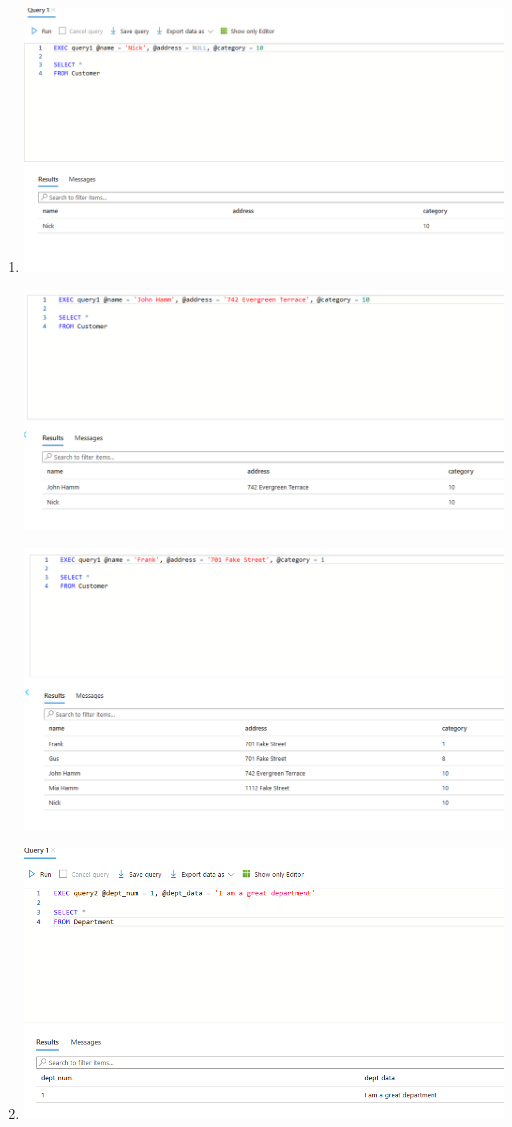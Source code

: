 \documentclass[11pt]{article}
\begin{document}
\begin{enumerate}
\item 
\includegraphics[width = \textwidth]{insertCust1.png}

\includegraphics[width = \textwidth]{insertCust2.png}

\includegraphics[width = \textwidth]{insertCust3.png}

\item
\includegraphics[width = \textwidth]{insertDept1.png}


\end{enumerate}
\end{document}
